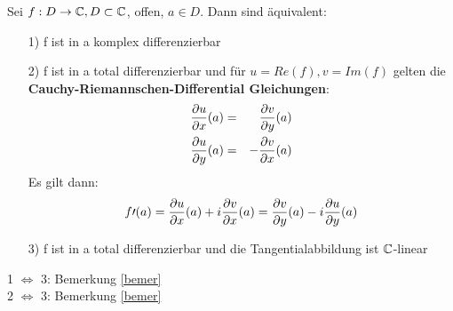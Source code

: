 \begin{satz}
	Sei $f:D\to \mathbb{C}, D\subset \mathbb{C}$, offen, $ a\in D$. Dann sind äquivalent:
	\begin{itemize}
		\item[1)]
		f ist in a komplex differenzierbar
		\item[2)]
		f ist in a total differenzierbar und für $u = Re(f), v = Im(f)$ gelten die 
		\textbf{Cauchy-Riemannschen-Differential Gleichungen}:
		\begin{eqnarray*}
			\frac{\partial u}{\partial x}(a) &=& \frac{\partial v}{\partial y}(a) \\
			\frac{\partial u}{\partial y}(a) &=& -\frac{\partial v}{\partial x}(a)
		\end{eqnarray*}
		Es gilt dann:
		\[
		f\prime(a) = \frac{\partial u}{\partial x}(a) + i \frac{\partial v}{\partial x}(a)
		= \frac{\partial v}{\partial y}(a) -i \frac{\partial u}{\partial y}(a)
		\]
		\item[3)]
		f ist in a total differenzierbar und die Tangentialabbildung ist $\mathbb{C}$-linear
	\end{itemize} 
\end{satz}

\begin{bew}
	1 $\Leftrightarrow$ 3: Bemerkung \ref{bemer} \\
	2 $\Leftrightarrow$ 3: Bemerkung \ref{bemer}
\end{bew}

